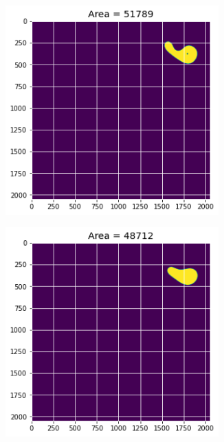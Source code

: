 \documentclass[12pt, a4paper]{report}
\begin{document}
\begin{figure}[H]
\begin{subfigure}{.24\textwidth}
  \label{img:microstrImg}
\end{subfigure}
\begin{subfigure}{.24\textwidth}
  \centering
  \includegraphics[width=0.9\textwidth]{Pictures/Growth/4.3.jpeg}
  \label{img:microstrImg}
\end{subfigure}
\begin{subfigure}{.24\textwidth}
  \centering
  \includegraphics[width=0.9\textwidth]{Pictures/Growth/4.4.jpeg}

\end{subfigure}
\end{figure}
\end{document}
